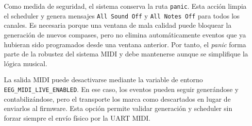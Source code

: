 Como medida de seguridad, el sistema conserva la ruta \texttt{panic}. Esta acción limpia el scheduler y genera mensajes \texttt{All Sound Off} y \texttt{All Notes Off} para todos los canales. Es necesaria porque una ventana de mala calidad puede bloquear la generación de nuevos compases, pero no elimina automáticamente eventos que ya hubieran sido programados desde una ventana anterior. Por tanto, el \textit{panic} forma parte de la robustez del sistema MIDI y debe mantenerse aunque se simplifique la lógica musical.

La salida MIDI puede desactivarse mediante la variable de entorno \texttt{EEG\_MIDI\_LIVE\_ENABLED}. En ese caso, los eventos pueden seguir generándose y contabilizándose, pero el transporte los marca como descartados en lugar de enviarlos al firmware. Esta opción permite validar generación y scheduler sin forzar siempre el envío físico por la UART MIDI.
